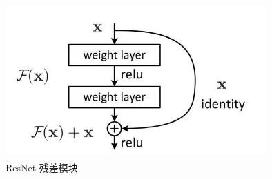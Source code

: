 \begin{figure}[h]
  \centering
  \includegraphics[width=10cm, height=6cm]{Img/resnet.jpg}
  \caption{ResNet 残差模块\cite{he2016deep}}
  \label{fig:resnet}
\end{figure}

